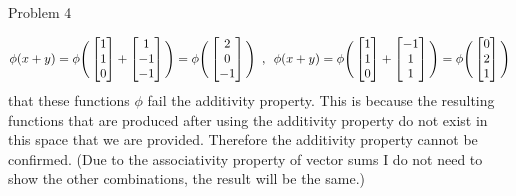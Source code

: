 \begin{problem}{Problem 4}
\begin{highlight}[Solution]
        \setcounter{equation}{0}
        \begin{equation}
            \phi(x + y) = \phi \Bigg(
                \begin{bmatrix}
                    1 \\
                    1 \\
                    0 \\
                \end{bmatrix}
                + 
                \begin{bmatrix}
                    1 \\
                    -1 \\
                    -1 \\
                \end{bmatrix}
                \Bigg) = \phi \Bigg(
                \begin{bmatrix}
                    2 \\
                    0 \\
                    -1 \\
                \end{bmatrix}
                \Bigg) \hspace*{5pt} , \hspace*{5pt}
            \phi(x + y) = \phi \Bigg(
                \begin{bmatrix}
                    1 \\
                    1 \\
                    0 \\
                \end{bmatrix}
                +
                \begin{bmatrix}
                    -1 \\
                    1 \\
                    1 \\
                \end{bmatrix}
                \Bigg) = \phi \Bigg(
                \begin{bmatrix}
                    0 \\
                    2 \\
                    1 \\
                \end{bmatrix}
                \Bigg)
        \end{equation}
        that these functions $\phi$ fail the additivity property. This is because the resulting functions that are produced after using the additivity property do not exist in this space that we are 
        provided. Therefore the additivity property cannot be confirmed. (Due to the associativity property of vector sums I do not need to show the other combinations, the result will be the same.)


\end{highlight}
\end{problem}
